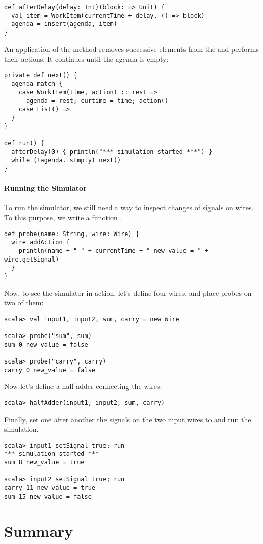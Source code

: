 {\begin{lstlisting}
def afterDelay(delay: Int)(block: => Unit) {
  val item = WorkItem(currentTime + delay, () => block)
  agenda = insert(agenda, item)
}
\end{lstlisting}
An application of the  method removes successive elements
from the  and performs their actions.
It continues until the agenda is empty:
\begin{lstlisting}
private def next() {
  agenda match {
    case WorkItem(time, action) :: rest =>
      agenda = rest; curtime = time; action()
    case List() =>
  }
}

def run() {
  afterDelay(0) { println("*** simulation started ***") }
  while (!agenda.isEmpty) next()
}
\end{lstlisting}

\paragraph{Running the Simulator}
To run the simulator, we still need a way to inspect changes of
signals on wires. To this purpose, we write a function .
\begin{lstlisting}
def probe(name: String, wire: Wire) {
  wire addAction {
    println(name + " " + currentTime + " new_value = " + wire.getSignal)
  }
}
\end{lstlisting}
Now, to see the simulator in action, let's define four wires, and place
probes on two of them: 
\begin{lstlisting}
scala> val input1, input2, sum, carry = new Wire

scala> probe("sum", sum)
sum 0 new_value = false

scala> probe("carry", carry)
carry 0 new_value = false
\end{lstlisting}
Now let's define a half-adder connecting the wires:
\begin{lstlisting}
scala> halfAdder(input1, input2, sum, carry)
\end{lstlisting}
Finally, set one after another the signals on the two input wires to
 and run the simulation.
\begin{lstlisting}
scala> input1 setSignal true; run
*** simulation started ***
sum 8 new_value = true

scala> input2 setSignal true; run
carry 11 new_value = true
sum 15 new_value = false
\end{lstlisting}

\section{Summary}

}
